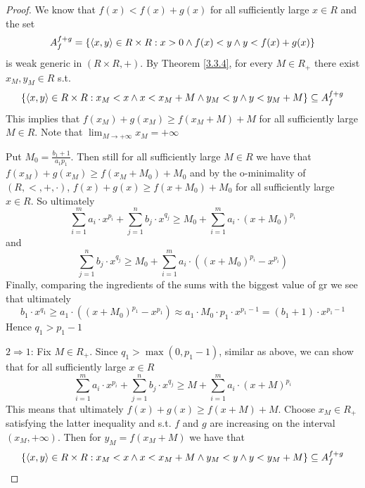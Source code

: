 \documentclass[11pt]{article}
\begin{document}
\begin{proof}
We know that \(f(x)<f(x)+g(x)\) for all sufficiently large \(x\in R\) and the set
\begin{equation*}
A_f^{f+g}=\{\langle x,y\rangle\in R\times R:x> 0\wedge f(x)<y\wedge y<f(x)+g(x)\}
\end{equation*}
is weak generic in \((R\times R,+)\). By Theorem \ref{3.3.4}, for every \(M\in R_+\) there
exist \(x_M,y_M\in R\) s.t.
\begin{equation*}
\{\langle x,y\rangle\in R\times R:x_M<x\wedge x<x_M+M\wedge y_M<y\wedge y<y_M+M\}\subseteq A_f^{f+g}
\end{equation*}
This implies that \(f(x_M)+g(x_M)\ge f(x_M+M)+M\) for all sufficiently large \(M\in R\). Note
that \(\lim_{M\to+\infty}x_M=+\infty\)

Put \(M_0=\frac{b_1+1}{a_1p_1}\). Then still for all sufficiently large \(M\in R\) we have
that \(f(x_M)+g(x_M)\ge f(x_M+M_0)+M_0\) and by the o-minimality
of \((R,<,+,\cdot)\), \(f(x)+g(x)\ge f(x+M_0)+M_0\) for all sufficiently large \(x\in R\). So ultimately
\begin{equation*}
\sum_{i=1}^ma_i\cdot x^{p_i}+\sum_{j=1}^nb_j\cdot x^{q_j}\ge M_0+\sum_{i=1}^ma_i\cdot(x+M_0)^{p_i}
\end{equation*}
and
\begin{equation*}
\sum_{j=1}^nb_j\cdot x^{q_j}\ge M_0+\sum_{i=1}^ma_i\cdot((x+M_0)^{p_i}-x^{p_i})
\end{equation*}
Finally, comparing the ingredients of the sums with the biggest value of gr we see that
ultimately
\begin{equation*}
b_1\cdot x^{q_1}\ge a_1\cdot((x+M_0)^{p_1}-x^{p_1})\approx a_1\cdot M_0\cdot p_1\cdot x^{p_1-1}=(b_1+1)\cdot x^{p_1-1}
\end{equation*}
Hence \(q_1>p_1-1\)

\(2\Rightarrow 1\): Fix \(M\in R_+\). Since \(q_1>\max(0,p_1-1)\), similar as above, we can show that for all
sufficiently large \(x\in R\)
\begin{equation*}
\sum_{i=1}^ma_i\cdot x^{p_i}+\sum_{j=1}^nb_j\cdot x^{q_j}\ge M+\sum_{i=1}^ma_i\cdot(x+M)^{p_i}
\end{equation*}
This means that ultimately \(f(x)+g(x)\ge f(x+M)+M\). Choose \(x_M\in R_+\) satisfying the latter
inequality and s.t. \(f\) and \(g\) are increasing on the interval \((x_M,+\infty)\). Then
for \(y_M=f(x_M+M)\) we have that
\begin{equation*}
\{\langle x,y\rangle\in R\times R:x_M<x\wedge x<x_M+M\wedge y_M<y\wedge y<y_M+M\}\subseteq A^{f+g}_f
\end{equation*}
\end{proof}
\end{document}
